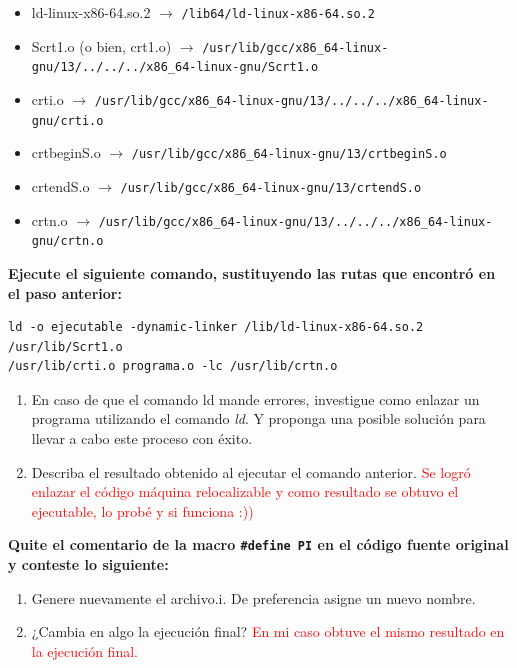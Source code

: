 \documentclass[11pt]{report}
\begin{document}
\begin{itemize}
  \item ld-linux-x86-64.so.2 $\to$ \texttt{/lib64/ld-linux-x86-64.so.2}
  \item Scrt1.o (o bien, crt1.o) $\to$ \texttt{/usr/lib/gcc/x86\_64-linux-gnu/13/../../../x86\_64-linux-gnu/Scrt1.o}
  \item crti.o $\to$ \texttt{/usr/lib/gcc/x86\_64-linux-gnu/13/../../../x86\_64-linux-gnu/crti.o}
  \item crtbeginS.o $\to$ \texttt{/usr/lib/gcc/x86\_64-linux-gnu/13/crtbeginS.o}
  \item crtendS.o $\to$ \texttt{/usr/lib/gcc/x86\_64-linux-gnu/13/crtendS.o}
  \item crtn.o $\to$ \texttt{/usr/lib/gcc/x86\_64-linux-gnu/13/../../../x86\_64-linux-gnu/crtn.o}
\end{itemize}

\textbf{Ejecute el siguiente comando, sustituyendo las rutas que encontró en el paso anterior:}

\begin{verbatim}
ld -o ejecutable -dynamic-linker /lib/ld-linux-x86-64.so.2 /usr/lib/Scrt1.o
/usr/lib/crti.o programa.o -lc /usr/lib/crtn.o
\end{verbatim}

\begin{enumerate}[label=\alph*.]
  \item En caso de que el comando ld mande errores, investigue como enlazar un programa utilizando el comando \textit{ld}.
    Y proponga una posible solución para llevar a cabo este proceso con éxito.
  \item Describa el resultado obtenido al ejecutar el comando anterior. \textcolor{red}{Se logró enlazar el código máquina
    relocalizable y como resultado se obtuvo el ejecutable, lo probé y si funciona :))}
\end{enumerate}

\textbf{Quite el comentario de la macro \texttt{\#define PI} en el código fuente original y conteste lo siguiente:}

\begin{enumerate}[label=\alph*.]
  \item  Genere nuevamente el archivo.i. De preferencia asigne un nuevo nombre.
  \item ¿Cambia en algo la ejecución final? \textcolor{red}{En mi caso obtuve el mismo resultado en la ejecución final.}
\end{enumerate}
\end{document}
